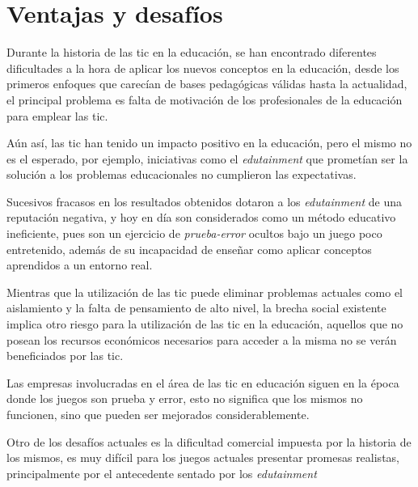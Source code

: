 \section{Ventajas y desafíos}
\label{sec:tics_ventajas}

Durante la historia de las \Gls{tic} en la educación, se han encontrado
diferentes dificultades a la hora de aplicar los nuevos conceptos en la
educación, desde los primeros enfoques que carecían de bases pedagógicas válidas
hasta la actualidad, el principal problema es falta de motivación de los
profesionales de la educación para emplear las
\Gls{tic}\cite{punie:ict,ict:romeo}.


Aún así, las \Gls{tic} han tenido un impacto positivo en la educación, pero el
mismo no es el esperado\cite{punie:ict}, por ejemplo, iniciativas como el
\emph{edutainment} que prometían ser la solución a los problemas
educacionales no cumplieron las expectativas.

Sucesivos fracasos en los resultados obtenidos dotaron a los \emph{edutainment}
de una reputación negativa, y hoy en día son considerados como un método educativo 
ineficiente, pues son un ejercicio de \emph{prueba-error} ocultos bajo un juego poco 
entretenido, además de su incapacidad de enseñar como aplicar conceptos aprendidos 
a un entorno real\cite{resnick:2004}.

Mientras que la utilización de las \Gls{tic} puede eliminar problemas actuales
como el aislamiento y la falta de pensamiento de alto nivel\cite{punie:ict}, la
brecha social existente implica otro riesgo para la utilización de las \Gls{tic}
en la educación, aquellos que no posean los recursos económicos necesarios para
acceder a la misma no se verán beneficiados por las \Gls{tic}\cite{punie:ict}.

Las empresas involucradas en el área de las \Gls{tic} en
educación siguen en la época donde los juegos son prueba y error, esto no
significa que los mismos no funcionen, sino que pueden ser mejorados
considerablemente\cite{egenfeldt2007third}.

Otro de los desafíos actuales es la dificultad comercial impuesta por la
historia de los mismos, es muy difícil para los juegos actuales presentar
promesas realistas, principalmente por el antecedente sentado por los
\emph{edutainment}\cite{egenfeldt2007third}

